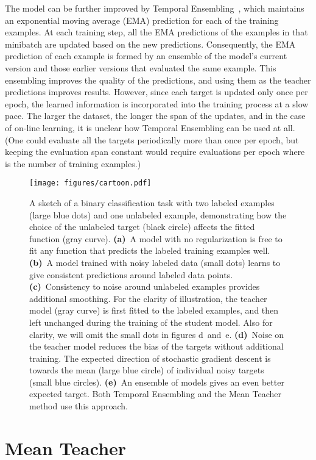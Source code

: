 \documentclass{article}
\begin{document}
The  model can be further improved by Temporal Ensembling~\citep{laine_temporal_2016}, which maintains an exponential moving average (EMA) prediction for each of the training examples.
At each training step, all the EMA predictions of the examples in that minibatch are updated based on the new predictions.
Consequently, the EMA prediction of each example is formed by an ensemble of the model's current version and those earlier versions that evaluated the same example.
This ensembling improves the quality of the predictions, and using them as the teacher predictions improves results.
However, since each target is updated only once per epoch, the learned information is incorporated into the training process at a slow pace.
The larger the dataset, the longer the span of the updates, and in the case of on-line learning, it is unclear how Temporal Ensembling can be used at all.
(One could evaluate all the targets periodically more than once per epoch, but keeping the evaluation span constant would require  evaluations per epoch where  is the number of training examples.)

\begin{figure}[t]
\centering
\texttt{[image: figures/cartoon.pdf]}
\caption{\label{fig:cartoon}
A sketch of a binary classification task with two labeled examples (large blue dots) and one unlabeled example, demonstrating how the choice of the unlabeled target (black circle) affects the fitted function (gray curve).
\textbf{(a)}~A model with no regularization is free to fit any function that predicts the labeled training examples well.
\textbf{(b)}~A model trained with noisy labeled data (small dots) learns to give consistent predictions around labeled data points.
\textbf{(c)}~Consistency to noise around unlabeled examples provides additional smoothing.
For the clarity of illustration, the teacher model (gray curve) is first fitted to the labeled examples, and then left unchanged during the training of the student model.
Also for clarity, we will omit the small dots in figures d~and~e.
\textbf{(d)}~Noise on the teacher model reduces the bias of the targets without additional training.
The expected direction of stochastic gradient descent is towards the mean (large blue circle) of individual noisy targets (small blue circles).
\textbf{(e)}~An ensemble of models gives an even better expected target. Both Temporal Ensembling and the Mean Teacher method use this approach.
}
\end{figure}

\section{Mean Teacher}
\end{document}
